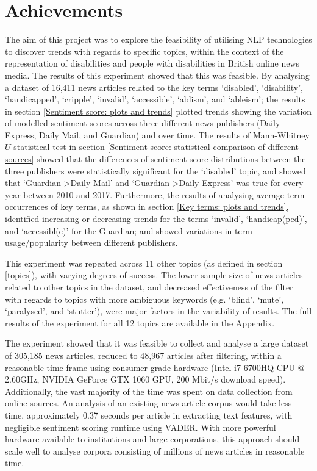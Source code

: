 \documentclass{report}
\begin{document}
\section{Achievements} \label{Achievements}

The aim of this project was to explore the feasibility of utilising NLP technologies to discover trends with regards to specific topics, within the context of the representation of disabilities and people with disabilities in British online news media.
The results of this experiment showed that this was feasible.
By analysing a dataset of 16,411 news articles related to the key terms `disabled', `disability', `handicapped', `cripple', `invalid', `accessible', `ablism', and `ableism'; the results in section \ref{Sentiment score: plots and trends} plotted trends showing the variation of modelled sentiment scores across three different news publishers (Daily Express, Daily Mail, and Guardian) and over time.
The results of Mann-Whitney $U$ statistical test in section \ref{Sentiment score: statistical comparison of different sources} showed that the differences of sentiment score distributions between the three publishers were statistically significant for the `disabled' topic, and showed that `Guardian \textgreater\space Daily Mail' and `Guardian \textgreater\space Daily Express' was true for every year between 2010 and 2017.
Furthermore, the results of analysing average term occurrences of key terms, as shown in section \ref{Key terms: plots and trends}, identified increasing or decreasing trends for the terms `invalid', `handicap(ped)', and `accessibl(e)' for the Guardian; and showed variations in term usage/popularity between different publishers.

This experiment was repeated across 11 other topics (as defined in section \ref{topics}), with varying degrees of success. 
The lower sample size of news articles related to other topics in the dataset, and decreased effectiveness of the filter with regards to topics with more ambiguous keywords (e.g. `blind', `mute', `paralysed', and `stutter'), were major factors in the variability of results.
The full results of the experiment for all 12 topics are available in the Appendix.
 
The experiment showed that it was feasible to collect and analyse a large dataset of 305,185 news articles, reduced to 48,967 articles after filtering, within a reasonable time frame using consumer-grade hardware (Intel i7-6700HQ CPU @ 2.60GHz, NVIDIA GeForce GTX 1060 GPU, 200 Mbit/s download speed).
Additionally, the vast majority of the time was spent on data collection from online sources.
An analysis of an existing news article corpus would take less time, approximately 0.37 seconds per article in extracting text features, with negligible sentiment scoring runtime using VADER.
With more powerful hardware available to institutions and large corporations, this approach should scale well to analyse corpora consisting of millions of news articles in reasonable time.
\end{document}
